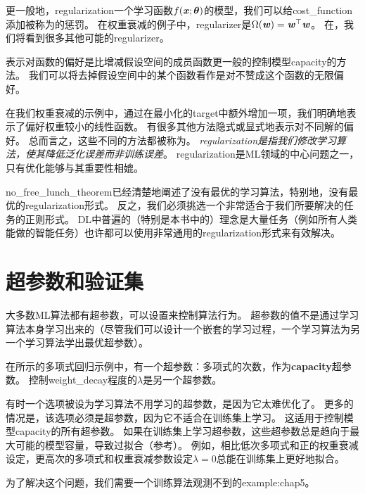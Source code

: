 更一般地，\gls{regularization}一个学习函数$f(\boldsymbol{\mathit{x}};\boldsymbol{\theta})$的模型，我们可以给\gls{cost_function}添加被称为的惩罚。
在权重衰减的例子中，\gls{regularizer}是$\Omega(\boldsymbol{\mathit{w}}) = \boldsymbol{\mathit{w}}^\top \boldsymbol{\mathit{w}}$。
在，我们将看到很多其他可能的\gls{regularizer}。


表示对函数的偏好是比增减假设空间的成员函数更一般的控制模型\gls{capacity}的方法。
我们可以将去掉假设空间中的某个函数看作是对不赞成这个函数的无限偏好。

在我们权重衰减的示例中，通过在最小化的\gls{target}中额外增加一项，我们明确地表示了偏好权重较小的线性函数。
有很多其他方法隐式或显式地表示对不同解的偏好。
总而言之，这些不同的方法都被称为。
\emph{\gls{regularization}是指我们修改学习算法，使其降低泛化误差而非训练误差}。
\gls{regularization}是\gls{ML}领域的中心问题之一，只有优化能够与其重要性相媲。

\gls{no_free_lunch_theorem}已经清楚地阐述了没有最优的学习算法，特别地，没有最优的\gls{regularization}形式。
反之，我们必须挑选一个非常适合于我们所要解决的任务的正则形式。
\gls{DL}中普遍的（特别是本书中的）理念是大量任务（例如所有人类能做的智能任务）也许都可以使用非常通用的\gls{regularization}形式来有效解决。

\section{超参数和验证集}
\label{sec:hyperparameters_and_validation_sets}
大多数\gls{ML}算法都有超参数，可以设置来控制算法行为。
超参数的值不是通过学习算法本身学习出来的（尽管我们可以设计一个嵌套的学习过程，一个学习算法为另一个学习算法学出最优超参数）。

在所示的多项式回归示例中，有一个超参数：多项式的次数，作为\textbf{\gls{capacity}}超参数。
控制\gls{weight_decay}程度的$\lambda$是另一个超参数。

有时一个选项被设为学习算法不用学习的超参数，是因为它太难优化了。
更多的情况是，该选项必须是超参数，因为它不适合在训练集上学习。
这适用于控制模型\gls{capacity}的所有超参数。
如果在训练集上学习超参数，这些超参数总是趋向于最大可能的模型容量，导致过拟合（参考）。
例如，相比低次多项式和正的权重衰减设定，更高次的多项式和权重衰减参数设定$\lambda=0$总能在训练集上更好地拟合。


为了解决这个问题，我们需要一个训练算法观测不到的\gls{example:chap5}。

